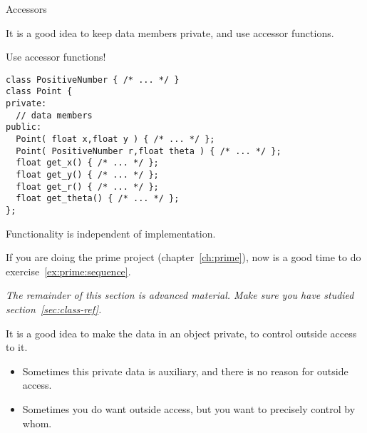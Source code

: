  {Accessors}

It is a good idea to keep data members private, and use accessor
functions.

\begin{block}{Use accessor functions!}
  \label{sl:repr-independent}
\begin{verbatim}
class PositiveNumber { /* ... */ }
class Point {
private:
  // data members
public:
  Point( float x,float y ) { /* ... */ };
  Point( PositiveNumber r,float theta ) { /* ... */ };
  float get_x() { /* ... */ };
  float get_y() { /* ... */ };
  float get_r() { /* ... */ };
  float get_theta() { /* ... */ };
};
\end{verbatim}
  Functionality is independent of implementation.
\end{block}

\begin{comment}
  \begin{exercise}
    \label{ex:geom:twoconstruct}
    Write a \n{Point} class that has two constructors:
\begin{verbatim}
class Point {
private:
  // data members
public:
  Point( float x,float y ) { /* ... */ };
  Point( float r,float theta ) { /* ... */ };
  float get_x() { /* ... */ };
  float get_y() { /* ... */ };
  float get_r() { /* ... */ };
  float get_theta() { /* ... */ };
};
\end{verbatim}
Use $r,\theta$ for the private variables, do not store $x,y$.
  \end{exercise}
\end{comment}

\begin{exercise}
  If you are doing the prime project (chapter~\ref{ch:prime}),
  now is a good time to do exercise~\ref{ex:prime:sequence}.
\end{exercise}

\emph{The remainder of this section is advanced material. Make sure
  you have studied section~\ref{sec:class-ref}.}

It is a good idea to make the data in an object private,
to control outside access to it.
\begin{itemize}
\item Sometimes this private data is auxiliary, and there is no reason
  for outside access.
\item Sometimes you do want outside access, but you want to precisely
  control by whom.
\end{itemize}

